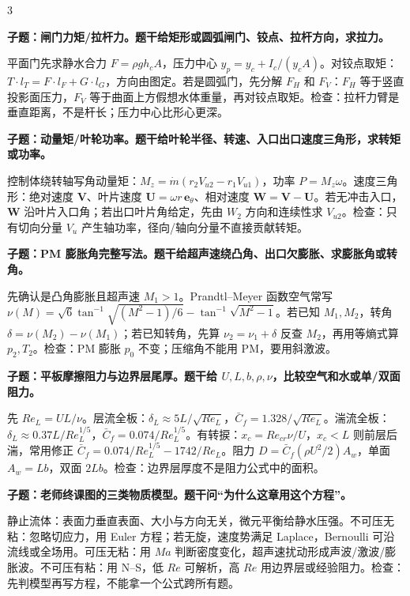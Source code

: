 \documentclass[a4paper]{article}
\newcommand{\qt}[1]{\vspace{0.10pt}\colorbox{Q}{\parbox{\dimexpr\linewidth-2\fboxsep}{\color{white}\bfseries #1}}\par}
\newcommand{\ans}[1]{\colorbox{G}{\parbox{\dimexpr\linewidth-2\fboxsep}{#1}}\par}
\begin{document}
\begin{multicols}{3}
\qt{子题：闸门力矩/拉杆力。题干给矩形或圆弧闸门、铰点、拉杆方向，求拉力。}
\ans{平面门先求静水合力 $F=\rho gh_cA$，压力中心 $y_p=y_c+I_c/(y_cA)$。对铰点取矩：$T\cdot l_T=F\cdot l_F+G\cdot l_G$，方向由图定。若是圆弧门，先分解 $F_H$ 和 $F_V$：$F_H$ 等于竖直投影面压力，$F_V$ 等于曲面上方假想水体重量，再对铰点取矩。检查：拉杆力臂是垂直距离，不是杆长；压力中心比形心更深。}
\qt{子题：动量矩/叶轮功率。题干给叶轮半径、转速、入口出口速度三角形，求转矩或功率。}
\ans{控制体绕转轴写角动量矩：$M_z=\dot m(r_2V_{u2}-r_1V_{u1})$，功率 $P=M_z\omega$。速度三角形：绝对速度 $\bm V$、叶片速度 $\bm U=\omega r\,\bm e_\theta$、相对速度 $\bm W=\bm V-\bm U$。若无冲击入口，$\bm W$ 沿叶片入口角；若出口叶片角给定，先由 $W_2$ 方向和连续性求 $V_{u2}$。检查：只有切向分量 $V_u$ 产生轴功率，径向/轴向分量不直接贡献转矩。}
\qt{子题：PM 膨胀角完整写法。题干给超声速绕凸角、出口欠膨胀、求膨胀角或转角。}
\ans{先确认是凸角膨胀且超声速 $M_1>1$。Prandtl--Meyer 函数空气常写 $\nu(M)=\sqrt6\tan^{-1}\sqrt{(M^2-1)/6}-\tan^{-1}\sqrt{M^2-1}$。若已知 $M_1,M_2$，转角 $\delta=\nu(M_2)-\nu(M_1)$；若已知转角，先算 $\nu_2=\nu_1+\delta$ 反查 $M_2$，再用等熵式算 $p_2,T_2$。检查：PM 膨胀 $p_0$ 不变；压缩角不能用 PM，要用斜激波。}
\qt{子题：平板摩擦阻力与边界层尾厚。题干给 $U,L,b,\rho,\nu$，比较空气和水或单/双面阻力。}
\ans{先 $Re_L=UL/\nu$。层流全板：$\delta_L\approx5L/\sqrt{Re_L}$，$\bar C_f=1.328/\sqrt{Re_L}$。湍流全板：$\delta_L\approx0.37L/Re_L^{1/5}$，$\bar C_f=0.074/Re_L^{1/5}$。有转捩：$x_c=Re_{cr}\nu/U$，$x_c<L$ 则前层后湍，常用修正 $\bar C_f=0.074/Re_L^{1/5}-1742/Re_L$。阻力 $D=\bar C_f(\rho U^2/2)A_w$，单面 $A_w=Lb$，双面 $2Lb$。检查：边界层厚度不是阻力公式中的面积。}
\qt{子题：老师终课图的三类物质模型。题干问“为什么这章用这个方程”。}
\ans{静止流体：表面力垂直表面、大小与方向无关，微元平衡给静水压强。不可压无粘：忽略切应力，用 Euler 方程；若无旋，速度势满足 Laplace，Bernoulli 可沿流线或全场用。可压无粘：用 $Ma$ 判断密度变化，超声速扰动形成声波/激波/膨胀波。不可压有粘：用 N--S，低 $Re$ 可解析，高 $Re$ 用边界层或经验阻力。检查：先判模型再写方程，不能拿一个公式跨所有题。}
\end{multicols}
\end{document}
